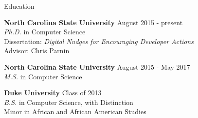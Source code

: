 \documentclass{resume} %
\begin{document}

\begin{rSection}{Education}

{\bf North Carolina State University} \hfill {August 2015 - present} \\ 
\textit{Ph.D.} in Computer Science \\
Dissertation: \textit{Digital Nudges for Encouraging Developer Actions} \\
Advisor: Chris Parnin

{\bf North Carolina State University} \hfill {August 2015 - May 2017} \\ 
\textit{M.S.} in Computer Science

{\bf Duke University} \hfill {Class of 2013} \\ 
\textit{B.S.} in Computer Science, with Distinction \\
Minor in African and African American Studies
\end{rSection}
\vspace{-8pt}
\end{document}

